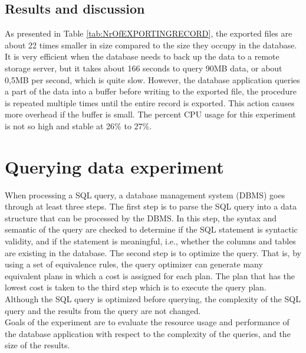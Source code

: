 \subsection{Results and discussion}
As presented in Table \ref{tab:NrOfEXPORTINGRECORD}, the exported files are about 22 times smaller in size compared to the size they occupy in the database. It is very efficient when the database needs to back up the data to a remote storage server, but it takes about 166 seconds to query 90MB data, or about 0,5MB per second, which is quite slow. However, the database application queries a part of the data into a buffer before writing to the exported file, the procedure is repeated multiple times until the entire record is exported. This action causes more overhead if the buffer is small. The percent CPU usage for this experiment is not so high and stable at 26\% to 27\%.
\section{Querying data experiment}
When processing a SQL query, a database management system (DBMS) goes through at least three steps. The first step is to parse the SQL query into a data structure that can be processed by the DBMS. In this step, the syntax and semantic of the query are checked to determine if the SQL statement is syntactic validity, and if the statement is meaningful, i.e., whether the columns and tables are existing in the database. The second step is to optimize the query. That is, by using a set of equivalence rules, the query optimizer can generate many equivalent plans in which a cost is assigned for each plan. The plan that has the lowest cost is taken to the third step which is to execute the query plan. Although the SQL query is optimized before querying, the complexity of the SQL query and the results from the query are not changed.\\
Goals of the experiment are to evaluate the resource usage and performance of the database application with respect to the complexity of the queries, and the size of the results.
